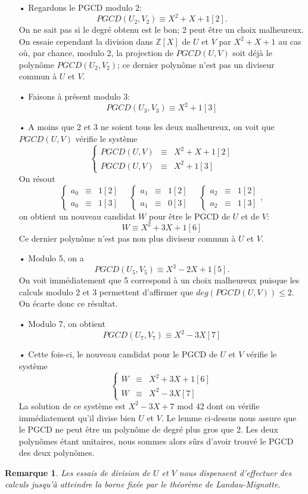 \documentclass[12pt]{report}
\newtheorem*{rem}{Remarque}
\begin{document}
\begin{itemize}
\item[•] Regardons le PGCD modulo $2$: 
$$   PGCD(U_2,V_2) \equiv X^2+X+1 [2]  .    $$
On ne sait pas si le degré obtenu est le bon; 2 peut être un choix malheureux. On essaie cependant la division dans $\mathbb{Z}[X]$ de $U$ et $V$ par $X^2+X+1$ au cas où, par chance, modulo 2, la projection de $PGCD(U,V)$ soit déjà le polynôme $PGCD(U_2,V_2)$; ce dernier polynôme n'est pas un diviseur commun à $U$ et $V$.
\item[•] Faisons à présent modulo $3$:
$$    PGCD(U_3,V_3) \equiv X^2+1 [3]      $$
\item[•] A moins que 2 et 3 ne soient tous les deux malheureux, on voit que $PGCD(U,V)$ vérifie le système
$$      \left \{     \begin{array}{ccc}
PGCD(U,V) & \equiv  & X^2 +X+1 [2] \\
PGCD(U,V) & \equiv & X^2+1 [3]
\end{array}     \right.     $$
On résout
\begin{equation*}      \left \{     \begin{array}{ccc}
a_0 & \equiv  & 1 [2] \\
a_0 & \equiv &1 [3]
\end{array}     \right.  \quad         \left \{     \begin{array}{ccc}
a_1 & \equiv  & 1 [2] \\
a_1 & \equiv &0 [3]
\end{array}     \right.    \quad
    \left \{     \begin{array}{ccc}
a_2 & \equiv  & 1 [2] \\
a_2 & \equiv &1 [3]
\end{array}     \right. ,  
  \end{equation*}
on obtient un nouveau candidat $W$ pour être le PGCD de $U$ et de $V$:
$$    W \equiv X^2+3X+1 [6]    $$
Ce dernier polynôme n'est pas non plus diviseur commun à $U$ et $V$.
\item[•] Modulo 5, on a
$$     PGCD(U_5,V_5) \equiv X^3  -2X+1[5].   $$
On voit immédiatement que 5 correspond à un choix malheureux puisque les calculs modulo 2 et 3 permettent d'affirmer que $deg(PGCD(U,V))\leq 2 $. On écarte donc ce résultat.
\item[•] Modulo 7, on obtient
$$    PGCD(U_7,V_7) \equiv X^2-3X [7]    $$
\item[•]
Cette fois-ci, le nouveau candidat pour le PGCD de $U$ et $V$ vérifie le système
$$      \left \{     \begin{array}{ccc}
W & \equiv  & X^2 +3X+1 [6] \\
W & \equiv & X^2-3X [7]
\end{array}     \right.     $$
La solution de ce système est $X^2 -3X+7$ mod $42$ dont on vérifie immédiatement qu'il divise bien $U$ et $V$. Le lemme ci-dessus nous assure que le PGCD ne peut être un polynôme de degré plus gros que 2. Les deux polynômes étant unitaires, nous sommes alors sûrs d'avoir trouvé le PGCD des deux polynômes. 
\end{itemize}

\begin{rem}
Les essais de division de $U$ et $V$ nous dispensent d'effectuer des calculs jusqu'à atteindre la borne fixée par le théorème de Landau-Mignotte.
\end{rem}






\end{document}
